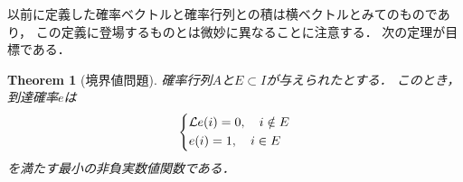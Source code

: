 \documentclass[dvipdfmx,autodetect-engine]{jsarticle}
\newtheorem{theorem}{Theorem}[section]
\theoremstyle{remark}
\theoremstyle{definition}
\begin{document}
以前に定義した確率ベクトルと確率行列との積は横ベクトルとみてのものであり，
この定義に登場するものとは微妙に異なることに注意する．
次の定理が目標である．


\begin{theorem}[境界値問題]\label{boundary_problem}
    確率行列$A$と$E \subset I$が与えられたとする．
    このとき，到達確率$e$は
    \begin{align}
        \begin{dcases}
            \mathcal{L}e(i) = 0, \quad i \notin E \\
            e(i) = 1, \quad i \in E 
        \end{dcases}
    \end{align}
    を満たす最小の非負実数値関数である．
\end{theorem}
\end{document}
